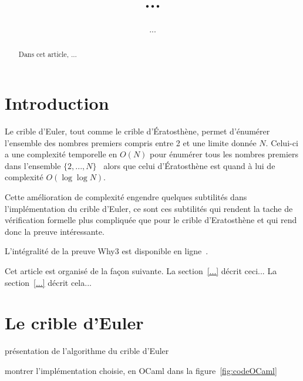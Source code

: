 \documentclass[a4paper]{easychair}
\begin{document}
\title{...}
\author{...}
\maketitle

\begin{abstract}
  Dans cet article, ...
\end{abstract}

\section{Introduction}


Le crible d'Euler, tout comme le crible d'\'{E}ratosthène, permet d'énumérer
l'ensemble des nombres premiers compris entre 2 et une limite donnée $N$.
Celui-ci a une complexité temporelle en $O(N)$ pour énumérer tous les
nombres premiers dans l'ensemble $\{2,...,N\}$~\cite{crible-euler} alors que celui
d'\'{E}ratosthène est quand à lui de complexité $O(\log\log N)$.

Cette amélioration de complexité engendre quelques subtilités dans l'implémentation
du crible d'Euler, ce sont ces subtilités qui rendent la tache de vérification
formelle plus compliquée que pour le crible d'{E}ratosthène et qui rend donc la
preuve intéressante.




L'intégralité de la preuve Why3 est disponible en ligne~\cite{mapreuve}.

Cet article est organisé de la façon suivante.
La section~\ref{...} décrit ceci...
La section~\ref{...} décrit cela...

\section{Le crible d'Euler}

présentation de l'algorithme du crible d'Euler

montrer l'implémentation choisie, en OCaml
dans la figure~\ref{fig:codeOCaml}
\end{document}
